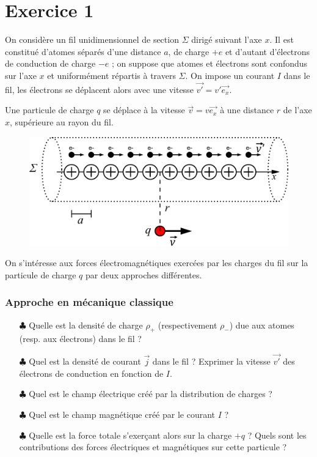 \documentclass{report}
\begin{document}
\section*{Exercice 1}

On considère un fil unidimensionnel de section $\Sigma$ dirigé suivant l'axe $x$. Il est constitué d'atomes séparés d'une distance $a$, de charge $+e$  et d'autant d'électrons de conduction de charge $-e$ ; on suppose que atomes et électrons sont confondus sur l'axe $x$ et uniformément répartis à travers $\Sigma$. On impose un courant $I$ dans le fil, les électrons se déplacent alors avec une vitesse $\vec{v'}=v'\vec{e_{x}}$.

Une particule de charge $q$ se déplace à la vitesse $\vec{v}=v\vec{e_{x}}$ à une distance $r$ de l'axe $x$, supérieure au rayon du fil.

\begin{figure}[h!]
\centering
		\includegraphics[scale=0.25]{cable.pdf}
\end{figure}

On s'intéresse aux forces électromagnétiques exercées par les charges du fil sur la particule de charge $q$ par deux approches différentes.

\subsubsection*{Approche en mécanique classique}

\begin{itemize}
	\item[$\clubsuit$] Quelle est la densité de charge $\rho_{+}$ (respectivement $\rho_{-}$) due aux atomes (resp. aux électrons) dans le fil ? 
	
	\item[$\clubsuit$] Quel est la densité de courant $\vec{j}$ dans le fil ? Exprimer la vitesse $\vec{v'}$ des électrons de conduction en fonction de $I$.
	
	\item[$\clubsuit$] Quel est le champ électrique créé par la distribution de charges ? 
	\item[$\clubsuit$] Quel est le champ magnétique créé par le courant $I$ ?
		\item[$\clubsuit$] Quelle est la force totale s'exerçant alors sur la charge $+q$ ? Quels sont les contributions des forces électriques et magnétiques sur cette particule ?
\end{itemize}
\end{document}
